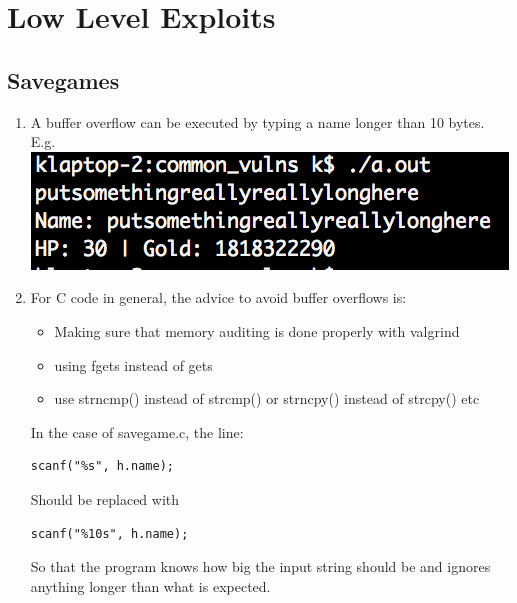 \documentclass[9pt,a4paper]{article}
\begin{document}
\maketitle
\small
\setlength{\parindent}{0pt}

\section{Low Level Exploits}

\subsection{Savegames}
\begin{enumerate}
\item A buffer overflow can be executed by typing a name longer than 10 bytes.\\
E.g.\\
\includegraphics{overflow}

\item For C code in general, the advice to avoid buffer overflows is:
\begin{itemize}
\item Making sure that memory auditing is done properly with valgrind
\item using fgets instead of gets
\item use strncmp() instead of strcmp() or strncpy() instead of strcpy() etc
\end{itemize}

In the case of savegame.c, the line:
\lstset{language=c}
\begin{lstlisting}
scanf("%s", h.name);
\end{lstlisting}
Should be replaced with
\begin{lstlisting}
scanf("%10s", h.name);
\end{lstlisting}
So that the program knows how big the input string should be and ignores anything longer than what is expected.


\end{enumerate}
\end{document}
